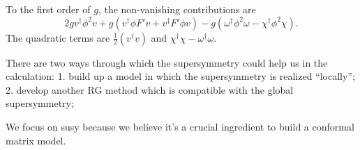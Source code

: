 To the first order of $g$, the non-vanishing contributions are
\[
2g v^\dagger \phi^2 v 
+ g (v^\dagger \phi F' v + v^\dagger F' \phi v) 
- g(\omega^\dagger \phi^2 \omega - \chi^\dagger \phi^2 \chi)
.\] 
The quadratic terms are $\frac{1}{2}(v^\dagger v)$
and $\chi^\dagger \chi - \omega^\dagger \omega$.

\begin{idea}
There are two ways through which the supersymmetry could help us in the calculation: 1. build up a model in which the supersymmetry is realized ``locally''; 2. develop another RG method which is compatible with the global supersymmetry;

We focus on susy because we believe it's a crucial ingredient to build a conformal matrix model.
\end{idea}
